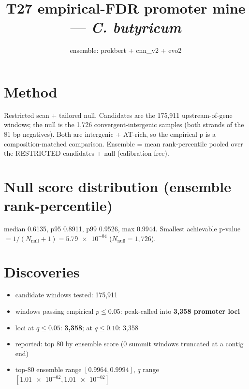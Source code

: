 \documentclass{article}
\title{T27 empirical-FDR promoter mine --- \textit{C. butyricum}}
\date{ensemble: prokbert + cnn\_v2 + evo2}
\begin{document}
\maketitle

\section*{Method}
Restricted scan + tailored null. Candidates are the 175,911 upstream-of-gene windows; the null is the 1,726 convergent-intergenic samples (both strands of the 81 bp negatives). Both are intergenic + AT-rich, so the empirical p is a composition-matched comparison. Ensemble = mean rank-percentile pooled over the RESTRICTED candidates + null (calibration-free).

\section*{Null score distribution (ensemble rank-percentile)}
median 0.6135, p95 0.8911, p99 0.9526, max 0.9944.
Smallest achievable p-value $= 1/(N_{\mathrm{null}}+1) = \num{5.79e-04}$
($N_{\mathrm{null}} = 1,726$).

\section*{Discoveries}
\begin{itemize}
  \item candidate windows tested: 175,911
  \item windows passing empirical $p \le 0.05$: peak-called into \textbf{3,358 promoter loci}
  \item loci at $q \le 0.05$: \textbf{3,358}; at $q \le 0.10$: 3,358
  \item reported: top 80 by ensemble score (0 summit windows truncated at a contig end)
  \item top-80 ensemble range $[0.9964, 0.9994]$, $q$ range $[\num{1.01e-02}, \num{1.01e-02}]$
\end{itemize}
\end{document}
